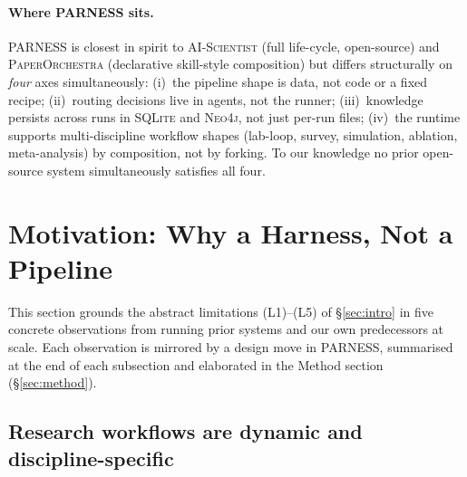 \documentclass{article}
\newcommand{\parness}{\textsf{PARNESS}}
\begin{document}
\paragraph{Where \parness{} sits.}
\parness{} is closest in spirit to \textsc{AI-Scientist} (full life-cycle,
open-source) and \textsc{PaperOrchestra} (declarative skill-style
composition) but differs structurally on \emph{four} axes simultaneously:
(i)~the pipeline shape is data, not code or a fixed recipe; (ii)~routing
decisions live in agents, not the runner; (iii)~knowledge persists across
runs in \textsc{SQLite} and \textsc{Neo4j}, not just per-run files;
(iv)~the runtime supports multi-discipline workflow shapes (lab-loop,
survey, simulation, ablation, meta-analysis) by composition, not by
forking. To our knowledge no prior open-source system simultaneously
satisfies all four.

\section{Motivation: Why a Harness, Not a Pipeline}
\label{sec:motivation}

This section grounds the abstract limitations (L1)--(L5) of
\S\ref{sec:intro} in five concrete observations from running prior
systems and our own predecessors at scale. Each observation is mirrored
by a design move in \parness{}, summarised at the end of each
subsection and elaborated in the Method section (\S\ref{sec:method}).

\subsection{Research workflows are dynamic and discipline-specific}
\label{sec:m1}
\end{document}
